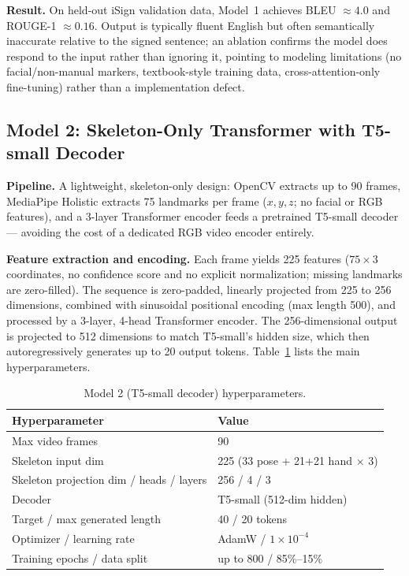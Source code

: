 \documentclass[pdflatex,sn-mathphys-num]{sn-jnl}
\begin{document}
\textbf{Result.} On held-out iSign validation data, Model~1 achieves BLEU $\approx 4.0$ and ROUGE-1 $\approx 0.16$. Output is typically fluent English but often semantically inaccurate relative to the signed sentence; an ablation confirms the model does respond to the input rather than ignoring it, pointing to modeling limitations (no facial/non-manual markers, textbook-style training data, cross-attention-only fine-tuning) rather than a implementation defect.

\subsection{Model 2: Skeleton-Only Transformer with T5-small Decoder}\label{sec:model2}
\textbf{Pipeline.} A lightweight, skeleton-only design: OpenCV extracts up to 90 frames, MediaPipe Holistic extracts 75 landmarks per frame ($x,y,z$; no facial or RGB features), and a 3-layer Transformer encoder feeds a pretrained T5-small decoder — avoiding the cost of a dedicated RGB video encoder entirely.

\textbf{Feature extraction and encoding.} Each frame yields 225 features ($75 \times 3$ coordinates, no confidence score and no explicit normalization; missing landmarks are zero-filled). The sequence is zero-padded, linearly projected from 225 to 256 dimensions, combined with sinusoidal positional encoding (max length 500), and processed by a 3-layer, 4-head Transformer encoder. The 256-dimensional output is projected to 512 dimensions to match T5-small's hidden size, which then autoregressively generates up to 20 output tokens. Table~\ref{tab:model2-hp} lists the main hyperparameters.

\begin{table}[h]
\centering
\caption{Model 2 (T5-small decoder) hyperparameters.}\label{tab:model2-hp}
\begin{tabular}{@{}ll@{}}
\toprule
Hyperparameter & Value \\
\midrule
Max video frames & 90 \\
Skeleton input dim & 225 (33 pose + 21+21 hand $\times$ 3) \\
Skeleton projection dim / heads / layers & 256 / 4 / 3 \\
Decoder & T5-small (512-dim hidden) \\
Target / max generated length & 40 / 20 tokens \\
Optimizer / learning rate & AdamW / $1\times10^{-4}$ \\
Training epochs / data split & up to 800 / 85\%--15\% \\
\bottomrule
\end{tabular}
\end{table}
\end{document}
